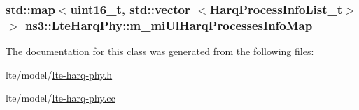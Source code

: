 \subsubsection[{\texorpdfstring{m\+\_\+mi\+Ul\+Harq\+Processes\+Info\+Map}{m_miUlHarqProcessesInfoMap}}]{\setlength{\rightskip}{0pt plus 5cm}std\+::map$<$uint16\+\_\+t, std\+::vector $<${\bf Harq\+Process\+Info\+List\+\_\+t}$>$ $>$ ns3\+::\+Lte\+Harq\+Phy\+::m\+\_\+mi\+Ul\+Harq\+Processes\+Info\+Map\hspace{0.3cm}{\ttfamily [private]}}\hypertarget{classns3_1_1LteHarqPhy_a5c2076f55ee78d6e83434e34db799e67}{}\label{classns3_1_1LteHarqPhy_a5c2076f55ee78d6e83434e34db799e67}


The documentation for this class was generated from the following files\+:\begin{DoxyCompactItemize}
\item 
lte/model/\hyperlink{lte-harq-phy_8h}{lte-\/harq-\/phy.\+h}\item 
lte/model/\hyperlink{lte-harq-phy_8cc}{lte-\/harq-\/phy.\+cc}\end{DoxyCompactItemize}
